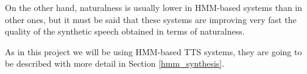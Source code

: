 On the other hand, naturalness is usually lower in HMM-based systems than in other ones, but it must be said that these systems are improving very fast the quality of the synthetic speech obtained in terms of naturalness. 

As in this project we will be using HMM-based TTS systems, they are going to be described with more detail in Section \ref{hmm_synthesis}.
